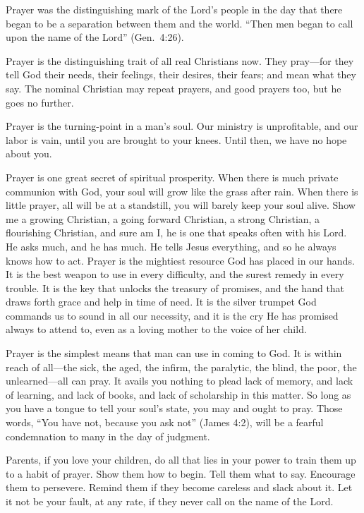 \documentclass[
]{book}
\begin{document}
Prayer was the distinguishing mark of the Lord's people in the day that there began to be a separation between them and the world. ``Then men began to call upon the name of the Lord'' (Gen.~4:26).

Prayer is the distinguishing trait of all real Christians now. They pray---for they tell God their needs, their feelings, their desires, their fears; and mean what they say. The nominal Christian may repeat prayers, and good prayers too, but he goes no further.

Prayer is the turning-point in a man's soul. Our ministry is unprofitable, and our labor is vain, until you are brought to your knees. Until then, we have no hope about you.

Prayer is one great secret of spiritual prosperity. When there is much private communion with God, your soul will grow like the grass after rain. When there is little prayer, all will be at a standstill, you will barely keep your soul alive. Show me a growing Christian, a going forward Christian, a strong Christian, a flourishing Christian, and sure am I, he is one that speaks often with his Lord. He asks much, and he has much. He tells Jesus everything, and so he always knows how to act. Prayer is the mightiest resource God has placed in our hands. It is the best weapon to use in every difficulty, and the surest remedy in every trouble. It is the key that unlocks the treasury of promises, and the hand that draws forth grace and help in time of need. It is the silver trumpet God commands us to sound in all our necessity, and it is the cry He has promised always to attend to, even as a loving mother to the voice of her child.

Prayer is the simplest means that man can use in coming to God. It is within reach of all---the sick, the aged, the infirm, the paralytic, the blind, the poor, the unlearned---all can pray. It avails you nothing to plead lack of memory, and lack of learning, and lack of books, and lack of scholarship in this matter. So long as you have a tongue to tell your soul's state, you may and ought to pray. Those words, ``You have not, because you ask not'' (James 4:2), will be a fearful condemnation to many in the day of judgment.

Parents, if you love your children, do all that lies in your power to train them up to a habit of prayer. Show them how to begin. Tell them what to say. Encourage them to persevere. Remind them if they become careless and slack about it. Let it not be your fault, at any rate, if they never call on the name of the Lord.
\end{document}
